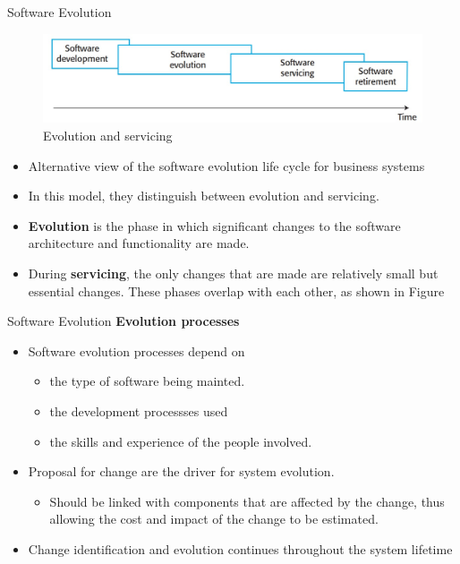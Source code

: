 \documentclass{beamer}
\begin{document}
\begin{frame}{Software Evolution}
	\begin{figure}
		\includegraphics[scale=.43]{img/m3_48}
		\caption{Evolution 
			and servicing 
		}
	\end{figure}
\begin{itemize}
	\item Alternative view of the software evolution life cycle for business systems
	\item In this model, they distinguish between evolution and servicing. 
	\item \textbf{Evolution }is the phase in which significant changes to the software architecture and functionality are made.
	\item During \textbf{servicing}, the only changes that are made are relatively small but essential changes. These phases overlap with each other, as shown in Figure 
	
\end{itemize}
\end{frame}
\begin{frame}{Software Evolution}
\textbf{Evolution processes }
\begin{itemize}
	\item Software evolution processes depend on
	\begin{itemize}
		\item the type of software being mainted.
		\item the development processses used
		\item the skills and experience of the people involved.
	\end{itemize}
\item Proposal for change are the driver for system evolution.
\begin{itemize}
	\item Should be linked with components that are affected by the change, thus allowing the cost and impact of the change to be estimated.
\end{itemize}
\item Change identification and evolution continues throughout the system lifetime
\end{itemize}
\end{frame}
\end{document}
